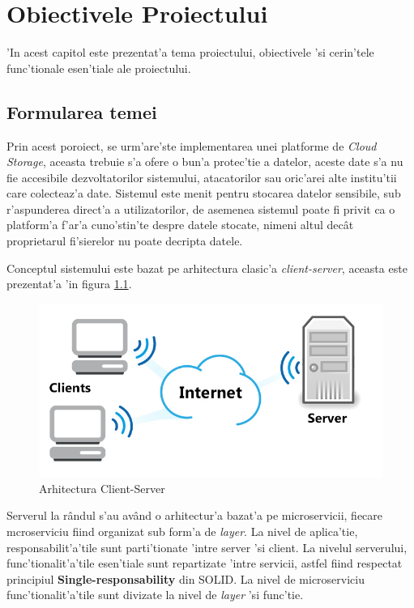 \documentclass[12pt,a4paper,twoside]{report}
\begin{document}
\chapter{Obiectivele Proiectului}
'In acest capitol este prezentat'a tema proiectului, obiectivele 'si cerin'tele func'tionale esen'tiale  ale proiectului.
\section{Formularea temei}
Prin acest poroiect, se urm'are'ste implementarea unei platforme de \textit{Cloud Storage}, aceasta trebuie s'a ofere o bun'a protec'tie a datelor, aceste date s'a nu fie accesibile dezvoltatorilor sistemului, atacatorilor sau oric'arei alte institu'tii care colecteaz'a date. Sistemul este menit pentru stocarea datelor sensibile, sub r'aspunderea direct'a a utilizatorilor, de asemenea sistemul poate fi privit ca o platform'a f'ar'a cuno'stin'te despre datele stocate, nimeni altul decât proprietarul fi'sierelor nu poate decripta datele.

Conceptul sistemului este bazat pe arhitectura clasic'a \textit{client-server}, aceasta este prezentat'a 'in figura \ref{client_server}.

\begin{figure}[H]
\begin{center}
\advance\leftskip-3cm
\advance\rightskip-3cm
\includegraphics[keepaspectratio=true,scale=0.3]{img/client-server.jpeg}
\caption{Arhitectura Client-Server}
\label{client_server}
\end{center}
\end{figure}

Serverul la rândul s'au având o arhitectur'a bazat'a pe microservicii, fiecare mcroserviciu fiind organizat sub form'a de \textit{layer}. La nivel de aplica'tie, responsabilit'a'tile sunt parti'tionate 'intre server 'si client. La nivelul serverului, func'tionalit'a'tile esen'tiale sunt repartizate 'intre servicii, astfel fiind respectat principiul \textbf{Single-responsability} din SOLID\cite{solid}.
La nivel de microserviciu func'tionalit'a'tile sunt divizate la nivel de \textit{layer} 'si func'tie.
\end{document}
